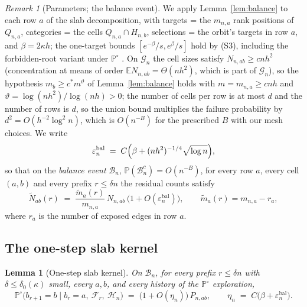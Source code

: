 \documentclass[11pt]{article}
\newcommand{\E}{\mathbb{E}}
\newcommand{\Prob}{\mathbb{P}}
\newcommand{\1}{\mathbf{1}}
\newcommand{\eps}{\varepsilon}
\newcommand{\cB}{\mathcal{B}}
\newcommand{\cF}{\mathcal{F}}
\newcommand{\cG}{\mathcal{G}}
\newcommand{\cH}{\mathcal{H}}
\newtheorem{lemma}[theorem]{Lemma}
\theoremstyle{remark}
\newtheorem{remark}[theorem]{Remark}
\begin{document}
\begin{remark}[Parameters; the balance event]\label{rem:balance-params}
We apply Lemma~\ref{lem:balance} to each row $a$ of the slab decomposition,
with targets = the $m_{n,a}$ rank positions of $Q_{n,a}$, categories = the
cells $Q_{n,a}\cap H_{n,b}$, selections = the orbit's targets in row $a$,
and $\beta=2\kappa h$; the one-target bounds $[e^{-\beta}/s,e^{\beta}/s]$
hold by (S3), including the forbidden-root variant under $\Prob^\circ$
\cite[Lemma~6.6]{Lon26}. On $\cG_n$ the cell sizes satisfy
$N_{n,ab}\ge cnh^2$ (concentration at means of order
$\E N_{n,ab}=\Theta(nh^2)$, which is part of $\cG_n$), so the hypothesis
$m_b\ge c^*m^\vartheta$ of Lemma~\ref{lem:balance} holds with
$m=m_{n,a}\ge cnh$ and $\vartheta=\log(nh^2)/\log(nh)>0$; the number of
cells per row is at most $d$ and the number of rows is $d$, so the union
bound multiplies the failure probability by $d^2=O(h^{-2}\log^2n)$, which is
$O(n^{-B})$ for the prescribed $B$ with our mesh choices. We write
\begin{equation}\label{eq:eps-bal}
\eps_n^{\mathrm{bal}}\;=\;
C\Bigl(\beta+(nh^2)^{-1/4}\sqrt{\log n}\Bigr),
\end{equation}
so that on the \emph{balance event} $\cB_n$,
$\Prob(\cB_n^c)=O(n^{-B})$, for every row $a$, every cell $(a,b)$ and every
prefix $r\le\delta n$ the residual counts satisfy
\begin{equation}\label{eq:resid-counts}
\widetilde N_{ab}(r)\;=\;
\frac{\widetilde m_a(r)}{m_{n,a}}\,N_{n,ab}\,
\bigl(1+O(\eps_n^{\mathrm{bal}})\bigr),
\qquad \widetilde m_a(r)=m_{n,a}-r_a,
\end{equation}
where $r_a$ is the number of exposed edges in row $a$.
\end{remark}

\subsection{The one-step slab kernel}
\begin{lemma}[One-step slab kernel]\label{lem:onestep}
On $\cB_n$, for every prefix $r\le\delta n$ with $\delta\le\delta_0(\kappa)$
small, every $a,b$, and every history of the $\Prob^\circ$
exploration,
\begin{equation}\label{eq:onestep}
\Prob^\circ\bigl(b_{r+1}=b\mid b_r=a,\ \cF_r,\ \cH_n\bigr)
\;=\;\bigl(1+O(\eta_n)\bigr)\,P_{n,ab},
\qquad \eta_n\;=\;C\bigl(\beta+\eps_n^{\mathrm{bal}}\bigr).
\end{equation}
\end{lemma}
\end{document}
